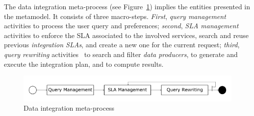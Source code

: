 The data integration meta-process (see Figure~\ref{fig:metaprocess}) implies the entities presented in the metamodel. 
It consists of three macro-steps.
\textit{First}, \textit{query management} activities  to process the user query and preferences; \textit{second}, \textit{SLA management} activities to enforce the SLA associated to the involved services, search and reuse previous \textsl{integration SLAs}, and create a new one for the current request; \textit{third}, \textit{query rewriting} activities~\cite{carvalho2016} to search and filter \textsl{data producers}, to generate and execute the integration plan, and to compute results.

\begin{figure}[h!]
\center
\includegraphics[scale=0.40]{meta-process.png}
\caption{Data integration meta-process}\label{fig:metaprocess}
\end{figure}

